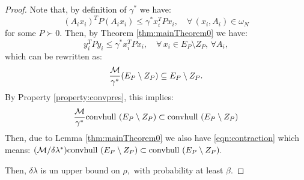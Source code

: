 \begin{proof}Note that, by definition of $\gamma^*$ we have:
\begin{equation*} (A_ix_i)^TP(A_ix_i) \leq \gamma^* x_i^TPx_i, \quad \forall\, (x_i, A_i)  \in \omega_N \end{equation*}
for some $P \succ 0$. Then, by Theorem \ref{thm:mainTheorem0} we have:
\begin{equation*} y_i^TPy_i \leq \gamma^*x_i^TPx_i, \quad \forall\, x_i \in E_P \setminus Z_P,\, \forall A_i, \end{equation*}
which can be rewritten as:
\begin{equation*}\frac{\mathcal{M}}{\gamma^*}(E_P \setminus Z_P) \subseteq E_P \setminus Z_P.
\end{equation*}
By Property \ref{property:convpres}, this implies:
$$\frac{\mathcal{M}}{\gamma^*} \mbox{convhull }(E_P \setminus Z_P) \subset \mbox{convhull }(E_P \setminus Z_P)$$
Then, due to Lemma \ref{thm:mainTheorem0} we also have \eqref{eqn:contraction} which means:
$(\mathcal{M}/\delta \lambda^*) \mbox{convhull } (E_P \setminus Z_P) \subset \mbox{convhull } (E_P\setminus Z_P).$

Then, $\delta\lambda$ is un upper bound on $\rho,$ with probability at least $\beta.$ 
\end{proof}